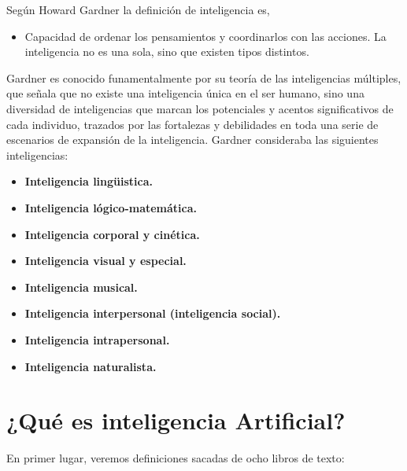 \documentclass{article}
\begin{document}
Según Howard Gardner la definición de inteligencia es,

\begin{itemize}
\item Capacidad de ordenar los pensamientos y coordinarlos con las acciones. La inteligencia no es una sola, sino que existen tipos distintos.
\end{itemize}

Gardner es conocido funamentalmente por su teoría de las inteligencias múltiples, que señala que no existe una inteligencia única en el ser humano, sino una diversidad de inteligencias que marcan los potenciales y acentos significativos de cada individuo, trazados por las fortalezas y debilidades en toda una serie de escenarios de expansión de la inteligencia. Gardner consideraba las siguientes inteligencias:

\begin{itemize}
\item \textbf{Inteligencia lingüistica.} 

\item \textbf{Inteligencia lógico-matemática.}

\item \textbf{Inteligencia corporal y cinética.}

\item \textbf{Inteligencia visual y especial.}

\item \textbf{Inteligencia musical.}

\item \textbf{Inteligencia interpersonal (inteligencia social).}

\item \textbf{Inteligencia intrapersonal.}

\item \textbf{Inteligencia naturalista.}
\end{itemize}

\section{¿Qué es inteligencia Artificial?}
En primer lugar, veremos definiciones sacadas de ocho libros de texto:
\end{document}
